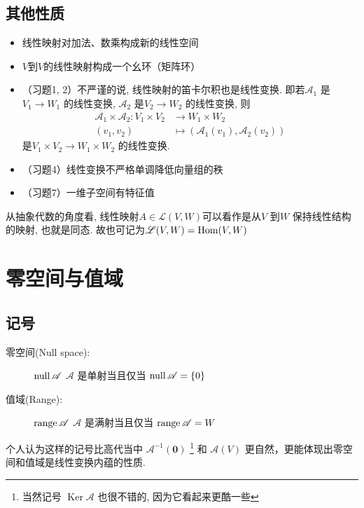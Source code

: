 \subsection{其他性质}
\begin{itemize}
    \item 线性映射对加法、数乘构成新的线性空间
    \item \(V\)到\(V\)的线性映射构成一个幺环（矩阵环）
    \item （习题1, 2）不严谨的说, 线性映射的笛卡尔积也是线性变换. 即若\(\mathscr{A}_{1}\)
        是\(V_{1} \to W_{1}\) 的线性变换, \(\mathscr{A}_{2}\)
        是\(V_{2} \to W_{2}\) 的线性变换, 则
        \begin{align*}
            \mathscr{A}_{1} \times \mathscr{A}_{2} : V_{1}
            \times V_{2} &\to W_{1} \times W_{2}\\
            (v_{1},v_{2}) &\mapsto
            (\mathscr{A}_{1}(v_{1}),\mathscr{A}_{2}(v_{2}))
        \end{align*}
        是\(V_{1} \times V_{2} \to
        W_{1} \times W_{2}\) 的线性变换.
    \item （习题4）线性变换不严格单调降低向量组的秩
    \item （习题7）一维子空间有特征值
\end{itemize}

从抽象代数的角度看, 线性映射\(A \in \mathscr{L}(V,W)\)可以看作是从\(V\) 到\(W\)
保持线性结构的映射, 也就是同态. 故也可记为\(\mathscr{L}(V,W)=\operatorname{Hom}(V,W)\)

\section{零空间与值域}
\subsection{记号}
\begin{description}
    \item[零空间(Null space):] \(\operatorname{null} \mathscr{A}\)
        \(\mathscr{A}\) 是单射当且仅当
        \(\operatorname{null} \mathscr{A} = \{0\}\)
    \item[值域(Range):] \(\operatorname{range} \mathscr{A}\)
        \(\mathscr{A}\) 是满射当且仅当
        \(\operatorname{range} \mathscr{A} = W\)
\end{description}
个人认为这样的记号比高代当中 \(\mathscr{A}^{-1}(\mathbf{0})\)
\footnote{当然记号 \(\operatorname{Ker} \mathscr{A}\) 也很不错的,
因为它看起来更酷一些 } 和 \(\mathscr{A}(V)\)
更自然，更能体现出零空间和值域是线性变换内蕴的性质.


